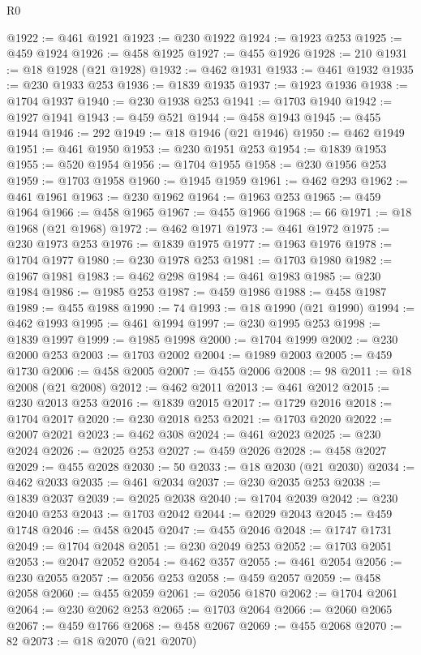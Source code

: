 \begin{lexlean}{R0}
\begin{coremodule}
@1922 := @461 @1921
@1923 := @230 @1922
@1924 := @1923 @253
@1925 := @459 @1924
@1926 := @458 @1925
@1927 := @455 @1926
@1928 := 210
@1931 := @18 @1928 (@21 @1928)
@1932 := @462 @1931
@1933 := @461 @1932
@1935 := @230 @1933 @253
@1936 := @1839 @1935
@1937 := @1923 @1936
@1938 := @1704 @1937
@1940 := @230 @1938 @253
@1941 := @1703 @1940
@1942 := @1927 @1941
@1943 := @459 @521
@1944 := @458 @1943
@1945 := @455 @1944
@1946 := 292
@1949 := @18 @1946 (@21 @1946)
@1950 := @462 @1949
@1951 := @461 @1950
@1953 := @230 @1951 @253
@1954 := @1839 @1953
@1955 := @520 @1954
@1956 := @1704 @1955
@1958 := @230 @1956 @253
@1959 := @1703 @1958
@1960 := @1945 @1959
@1961 := @462 @293
@1962 := @461 @1961
@1963 := @230 @1962
@1964 := @1963 @253
@1965 := @459 @1964
@1966 := @458 @1965
@1967 := @455 @1966
@1968 := 66
@1971 := @18 @1968 (@21 @1968)
@1972 := @462 @1971
@1973 := @461 @1972
@1975 := @230 @1973 @253
@1976 := @1839 @1975
@1977 := @1963 @1976
@1978 := @1704 @1977
@1980 := @230 @1978 @253
@1981 := @1703 @1980
@1982 := @1967 @1981
@1983 := @462 @298
@1984 := @461 @1983
@1985 := @230 @1984
@1986 := @1985 @253
@1987 := @459 @1986
@1988 := @458 @1987
@1989 := @455 @1988
@1990 := 74
@1993 := @18 @1990 (@21 @1990)
@1994 := @462 @1993
@1995 := @461 @1994
@1997 := @230 @1995 @253
@1998 := @1839 @1997
@1999 := @1985 @1998
@2000 := @1704 @1999
@2002 := @230 @2000 @253
@2003 := @1703 @2002
@2004 := @1989 @2003
@2005 := @459 @1730
@2006 := @458 @2005
@2007 := @455 @2006
@2008 := 98
@2011 := @18 @2008 (@21 @2008)
@2012 := @462 @2011
@2013 := @461 @2012
@2015 := @230 @2013 @253
@2016 := @1839 @2015
@2017 := @1729 @2016
@2018 := @1704 @2017
@2020 := @230 @2018 @253
@2021 := @1703 @2020
@2022 := @2007 @2021
@2023 := @462 @308
@2024 := @461 @2023
@2025 := @230 @2024
@2026 := @2025 @253
@2027 := @459 @2026
@2028 := @458 @2027
@2029 := @455 @2028
@2030 := 50
@2033 := @18 @2030 (@21 @2030)
@2034 := @462 @2033
@2035 := @461 @2034
@2037 := @230 @2035 @253
@2038 := @1839 @2037
@2039 := @2025 @2038
@2040 := @1704 @2039
@2042 := @230 @2040 @253
@2043 := @1703 @2042
@2044 := @2029 @2043
@2045 := @459 @1748
@2046 := @458 @2045
@2047 := @455 @2046
@2048 := @1747 @1731
@2049 := @1704 @2048
@2051 := @230 @2049 @253
@2052 := @1703 @2051
@2053 := @2047 @2052
@2054 := @462 @357
@2055 := @461 @2054
@2056 := @230 @2055
@2057 := @2056 @253
@2058 := @459 @2057
@2059 := @458 @2058
@2060 := @455 @2059
@2061 := @2056 @1870
@2062 := @1704 @2061
@2064 := @230 @2062 @253
@2065 := @1703 @2064
@2066 := @2060 @2065
@2067 := @459 @1766
@2068 := @458 @2067
@2069 := @455 @2068
@2070 := 82
@2073 := @18 @2070 (@21 @2070)

\end{coremodule}
\end{lexlean}
